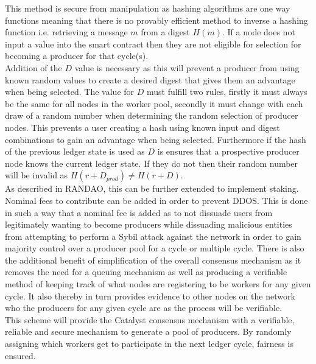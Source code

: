 This method is secure from manipulation as hashing algorithms are one way functions meaning that there is no provably efficient method to inverse a hashing function i.e. retrieving a message $m$ from a digest $H(m)$. If a node does not input a value into the smart contract then they are not eligible for selection for becoming a producer for that cycle(s). \\

Addition of the $D$ value is necessary as this will prevent a producer from using known random values to create a desired digest that gives them an advantage when being selected. The value for $D$ must fulfill two rules, firstly it must always be the same for all nodes in the worker pool, secondly it must change with each draw of a random number when determining the random selection of producer nodes. This prevents a user creating a hash using known input and digest combinations to gain an advantage when being selected. Furthermore if the hash of the previous ledger state is used as $D$ is ensures that a prospective producer node knows the current ledger state. If they do not then their random number will be invalid as $H(r + D_{prod}) \neq H(r + D)$. \\

As described in RANDAO, this can be further extended to implement staking. Nominal fees to contribute can be added in order to prevent DDOS. This is done in such a way that a nominal fee is added as to not dissuade users from legitimately wanting to become producers while dissuading malicious entities from attempting to perform a Sybil attack against the network in order to gain majority control over a producer pool for a cycle or multiple cycle. There is also the additional benefit of simplification of the overall consensus mechanism as it removes the need for a queuing mechanism as well as producing a verifiable method of keeping track of what nodes are registering to be workers for any given cycle. It also thereby in turn provides evidence to other nodes on the network who the producers for any given cycle are as the process will be verifiable. \\

This scheme will provide the Catalyst consensus mechanism with a verifiable, reliable and secure mechanism to generate a pool of producers. By randomly assigning which workers get to participate in the next ledger cycle, fairness is ensured. \\
